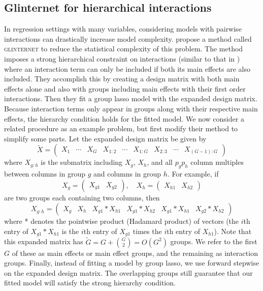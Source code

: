 \documentclass{imsart}
\begin{document}
\subsection{Glinternet for hierarchical interactions}
\label{sec:glint}
In regression settings with many variables, considering models with pairwise interactions can drastically increase model complexity. \cite{glint} propose a method called \textsc{glinternet} to reduce the statistical complexity of this problem. The method imposes a strong hierarchical constraint on interactions (similar to that in \cite{bien:hierarchical}) where an interaction term can only be included if both its main effects are also included. They accomplish this by creating a design matrix with both main effects alone and also with groups including main effects with their first order interactions. Then they fit a group lasso model with the expanded design matrix. Because interaction terms only appear in groups along with their respective main effects, the hierarchy condition holds for the fitted model. We now consider a related procedure as an example problem, but first modify their method to simplify some parts. Let the expanded design matrix be given by
\begin{equation}
\label{eq:glintmat}
\tilde X = \begin{pmatrix} X_1 & \cdots & X_G & X_{1:2} & \cdots & X_{1:G} & X_{2:3} & \cdots & X_{(G-1):G}  \end{pmatrix}
\end{equation}
where $X_{g:h}$ is the submatrix including $X_g$, $X_h$, and all
$p_gp_h$  column multiples between columns in group $g$ and columns
in group $h$. For example, if
\[
X_g = \begin{pmatrix} X_{g1} & X_{g2} \end{pmatrix}, \quad
X_h = \begin{pmatrix} X_{h1} & X_{h2} \end{pmatrix}
\]
are two groups each containing two columns, then
\[
X_{g:h} = \begin{pmatrix} X_g & X_h & X_{g1} * X_{h1} & X_{g1} * X_{h2} & X_{g1} * X_{h1} & X_{g2} * X_{h2} \end{pmatrix}
\]
where * denotes the pointwise product (Hadamard product) of vectors
(the $i$th entry of $X_{g1} * X_{h1}$ is the $i$th entry of $X_{g1}$ times
the $i$th entry of $X_{h1}$). Note that this expanded matrix has
$\tilde G = G + \binom{G}{2} = O(G^2)$ groups. We refer to the first
$G$ of these as main effects or main effect groups, and the remaining
as interaction groups. Finally, instead of fitting a
model by group lasso, we use forward stepwise on the expanded design
matrix. The overlapping groups still guarantee that our fitted model will
satisfy the strong hierarchy condition. 
\end{document}
